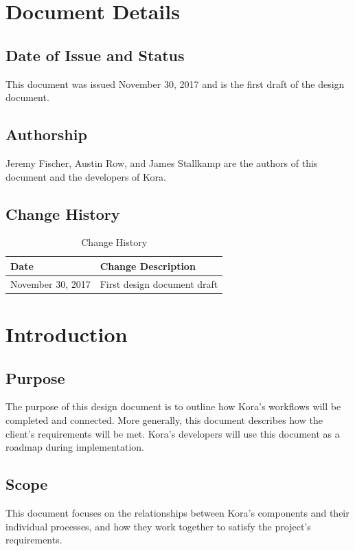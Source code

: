 \documentclass[onecolumn, draftclsnofoot,10pt, compsoc]{IEEEtran}
\begin{document}


\section{Document Details}
	\subsection{Date of Issue and Status}
		This document was issued November 30, 2017 and is the first draft of the design document.
	
	
	\subsection{Authorship}
		Jeremy Fischer, Austin Row, and James Stallkamp are the authors of this document and the developers of Kora.
		
	\subsection{Change History}
		\begin{table}[H]
			\centering
			\caption{Change History}
			\label{my-label}
			\begin{tabular}{|l|l|}
				\hline
				\textbf{Date}     & \textbf{Change Description}   \\ \hline
				November 30, 2017 & {First design document draft} \\ \hline
			\end{tabular}
		\end{table}

\section{Introduction}
	\subsection{Purpose}
		The purpose of this design document is to outline how Kora's workflows will be completed and connected.
		More generally, this document describes how the client's requirements will be met.
		Kora's developers will use this document as a roadmap during implementation.

	\subsection{Scope}
		This document focuses on the relationships between Kora's components and their individual processes, and how they work together to satisfy the project's requirements.
	
\end{document}
